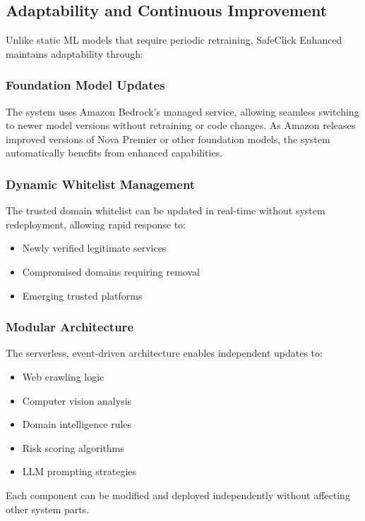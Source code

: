 \documentclass[conference]{IEEEtran}
\begin{document}
\subsection{Adaptability and Continuous Improvement}

Unlike static ML models that require periodic retraining, SafeClick Enhanced maintains adaptability through:

\subsubsection{Foundation Model Updates}

The system uses Amazon Bedrock's managed service, allowing seamless switching to newer model versions without retraining or code changes. As Amazon releases improved versions of Nova Premier or other foundation models, the system automatically benefits from enhanced capabilities.

\subsubsection{Dynamic Whitelist Management}

The trusted domain whitelist can be updated in real-time without system redeployment, allowing rapid response to:
\begin{itemize}
\item Newly verified legitimate services
\item Compromised domains requiring removal
\item Emerging trusted platforms
\end{itemize}

\subsubsection{Modular Architecture}

The serverless, event-driven architecture enables independent updates to:
\begin{itemize}
\item Web crawling logic
\item Computer vision analysis
\item Domain intelligence rules
\item Risk scoring algorithms
\item LLM prompting strategies
\end{itemize}

Each component can be modified and deployed independently without affecting other system parts.
\end{document}
